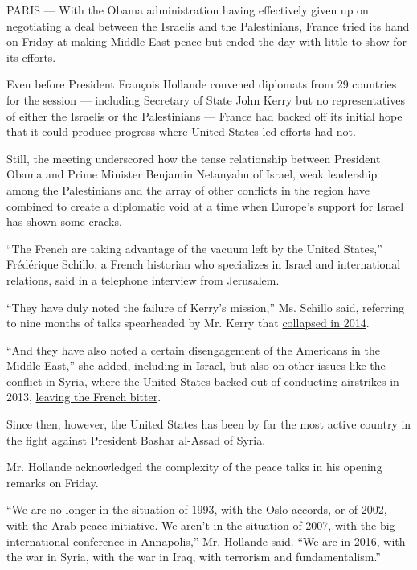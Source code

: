 PARIS --- With the Obama administration having effectively given up on
negotiating a deal between the Israelis and the Palestinians, France
tried its hand on Friday at making Middle East peace but ended the day
with little to show for its efforts.

Even before President François Hollande convened diplomats from 29
countries for the session --- including Secretary of State John Kerry
but no representatives of either the Israelis or the Palestinians ---
France had backed off its initial hope that it could produce progress
where United States-led efforts had not.

Still, the meeting underscored how the tense relationship between
President Obama and Prime Minister Benjamin Netanyahu of Israel, weak
leadership among the Palestinians and the array of other conflicts in
the region have combined to create a diplomatic void at a time when
Europe's support for Israel has shown some cracks.

``The French are taking advantage of the vacuum left by the United
States,'' Frédérique Schillo, a French historian who specializes in
Israel and international relations, said in a telephone interview from
Jerusalem.

``They have duly noted the failure of Kerry's mission,'' Ms. Schillo
said, referring to nine months of talks spearheaded by Mr. Kerry that
\href{http://nyti.ms/1izHQ2L}{collapsed in 2014}.

``And they have also noted a certain disengagement of the Americans in
the Middle East,'' she added, including in Israel, but also on other
issues like the conflict in Syria, where the United States backed out of
conducting airstrikes in 2013,
\href{http://www.nytimes.com/2016/02/23/world/europe/laurent-fabius-obama-syria-war.html?_r=0}{leaving
the French bitter}.

Since then, however, the United States has been by far the most active
country in the fight against President Bashar al-Assad of Syria.

Mr. Hollande acknowledged the complexity of the peace talks in his
opening remarks on Friday.

``We are no longer in the situation of 1993, with the
\href{http://www.nytimes.com/2015/10/01/world/middleeast/palestinians-mahmoud-abbas-oslo-peace-accords.html}{Oslo
accords}, or of 2002, with the
\href{http://www.nytimes.com/2002/03/27/world/mideast-turmoil-arabs-beirut-arab-officials-vow-move-saudi-peace-plan.html}{Arab
peace initiative}. We aren't in the situation of 2007, with the big
international conference in
\href{http://www.nytimes.com/2007/11/25/world/middleeast/25annapolis.html}{Annapolis},''
Mr. Hollande said. ``We are in 2016, with the war in Syria, with the war
in Iraq, with terrorism and fundamentalism.''

